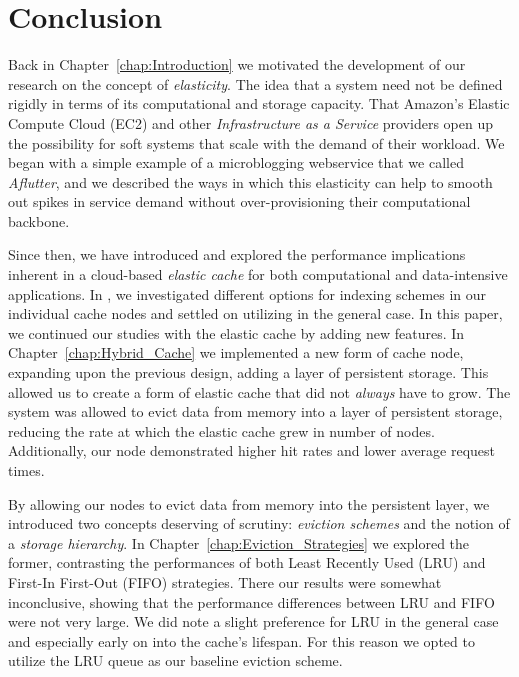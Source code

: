 \section{Conclusion} %
\label{sec:conclusion}
Back in Chapter~\ref{chap:Introduction} we motivated the development of our
research on the concept of \emph{elasticity}. The idea that a system need not
be defined rigidly in terms of its computational and storage capacity.  That
Amazon's Elastic Compute Cloud (EC2) and other \emph{Infrastructure as a
Service} providers open up the possibility for soft systems that scale with the
demand of their workload. We began with a simple example of a microblogging
webservice that we called \emph{Aflutter}, and we described the ways in which
this elasticity can help to smooth out spikes in service demand without
over-provisioning their computational backbone.

Since then, we have introduced and explored the performance implications
inherent in a cloud-based \emph{elastic cache} for both computational and
data-intensive applications. In \cite{chiu_ijngc11,chiu_ccgrid11}, we investigated different options for
indexing schemes in our individual cache nodes and settled on utilizing
\bptrees in the general case. In this paper, we continued our studies with the
elastic cache by adding new features. In Chapter~\ref{chap:Hybrid_Cache} we
implemented a new form of cache node, expanding upon the previous design,
adding a layer of persistent storage. This allowed us to create a form of
elastic cache that did not \emph{always} have to grow. The system was allowed
to evict data from memory into a layer of persistent storage, reducing the rate
at which the elastic cache grew in number of nodes. Additionally, our node
demonstrated higher hit rates and lower average request times.

By allowing our nodes to evict data from memory into the persistent layer, we
introduced two concepts deserving of scrutiny: \emph{eviction schemes} and the
notion of a \emph{storage hierarchy}. In Chapter~\ref{chap:Eviction_Strategies}
we explored the former, contrasting the performances of both Least Recently
Used (LRU) and First-In First-Out (FIFO) strategies. There our results were
somewhat inconclusive, showing that the performance differences between LRU and
FIFO were not very large. We did note a slight preference for LRU in the
general case and especially early on into the cache's lifespan. For this reason
we opted to utilize the LRU queue as our baseline eviction scheme.

